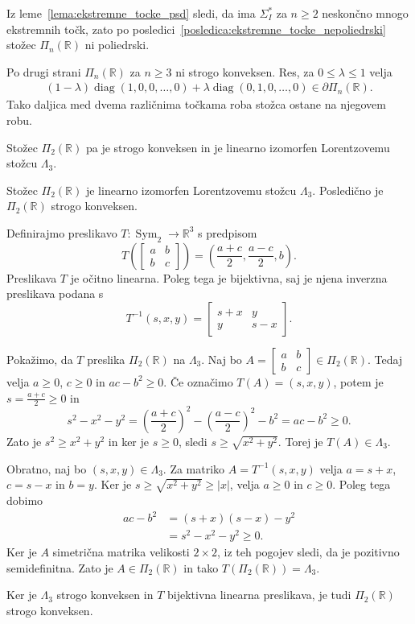 \documentclass[mat2, tisk]{fmfdelo}
\newcommand{\R}{\mathbb{R}}
\begin{document}
Iz leme~\ref{lema:ekstremne_tocke_psd} sledi, da ima
$\Sigma_I^*$ za $n\geq2$ neskončno mnogo ekstremnih točk, zato po
posledici~\ref{posledica:ekstremne_tocke_nepoliedrski}
stožec $\Pi_n(\R)$ ni poliedrski.

Po drugi strani $\Pi_n(\R)$ za $n\geq3$ ni strogo konveksen. Res, za
$0\leq\lambda\leq1$ velja
\begin{align*}
(1-\lambda)
\operatorname{diag}(1,0,0,\ldots,0)
+
\lambda
\operatorname{diag}(0,1,0,\ldots,0)
\in
\partial\Pi_n(\R).
\end{align*}
Tako daljica med dvema različnima točkama roba stožca ostane na
njegovem robu.

Stožec $\Pi_2(\R)$ pa je strogo konveksen in je linearno izomorfen
Lorentzovemu stožcu $\Lambda_3$.

\begin{trditev}
Stožec $\Pi_2(\R)$ je linearno izomorfen Lorentzovemu stožcu $\Lambda_3$.
Posledično je $\Pi_2(\R)$ strogo konveksen.
\end{trditev}

\begin{dokaz}
Definirajmo preslikavo $T:\operatorname{Sym}_2\longrightarrow\R^3$ s predpisom
\[
T\left(
\begin{bmatrix}
a & b\\
b & c
\end{bmatrix}
\right)
=
\left(
\frac{a+c}{2},
\frac{a-c}{2},
b
\right).
\]
Preslikava $T$ je očitno linearna. Poleg tega je bijektivna, saj je njena inverzna
preslikava podana s
\[
T^{-1}(s,x,y)
=
\begin{bmatrix}
s+x & y\\
y & s-x
\end{bmatrix}.
\]

Pokažimo, da $T$ preslika $\Pi_2(\R)$ na $\Lambda_3$. Naj bo
$A=\begin{bmatrix}a&b\\b&c\end{bmatrix}\in\Pi_2(\R)$. Tedaj velja
$a\geq0$, $c\geq0$ in $ac-b^2\geq0$. Če označimo
$T(A)=(s,x,y)$, potem je
$s=\frac{a+c}{2}\geq0$ in
\[
s^2-x^2-y^2
=
\left(\frac{a+c}{2}\right)^2
-
\left(\frac{a-c}{2}\right)^2
-b^2
=
ac-b^2
\geq0.
\]
Zato je $s^2\geq x^2+y^2$ in ker je $s\geq0$, sledi
$s\geq\sqrt{x^2+y^2}$. Torej je $T(A)\in\Lambda_3$.

Obratno, naj bo $(s,x,y)\in\Lambda_3$.
Za matriko
$A=T^{-1}(s,x,y)$ velja
$a=s+x$, $c=s-x$ in $b=y$.
Ker je
$s\geq\sqrt{x^2+y^2}\geq|x|$,
velja $a\geq0$ in $c\geq0$.
Poleg tega dobimo
\[
\begin{aligned}
ac-b^2
&=
(s+x)(s-x)-y^2\\
&=
s^2-x^2-y^2
\geq0.
\end{aligned}
\]
Ker je $A$ simetrična matrika velikosti
$2\times2$, iz teh pogojev sledi,
da je pozitivno semidefinitna.
Zato je $A\in\Pi_2(\R)$ in tako
$T(\Pi_2(\R))=\Lambda_3$.

Ker je $\Lambda_3$ strogo konveksen in $T$ bijektivna linearna preslikava,
je tudi $\Pi_2(\R)$ strogo konveksen.
\end{dokaz}
\end{document}
